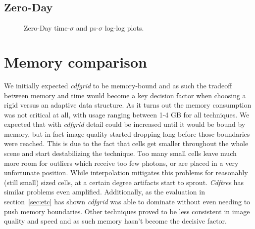 \subsection{Zero-Day}

\begin{figure}
    \centering
    \begin{subfigure}{.5\textwidth}
      \centering
        \caption{}
        \label{fig:zd_t}
    \end{subfigure}%
    \begin{subfigure}{.5\textwidth}
        \caption{}
        \label{fig:zd_ps}
    \end{subfigure}
    \caption{Zero-Day time-$\sigma$ and ps-$\sigma$ log-log plots.}
    \label{fig:zd}
\end{figure}

\section{Memory comparison}

We initially expected \textit{cdfgrid} to be memory-bound and as such the tradeoff between memory and time would become a key decision factor when choosing a rigid versus an adaptive data structure. As it turns out the memory consumption was not critical at all, with usage ranging between 1-4 GB for all techniques. We expected that with \textit{cdfgrid} detail could be increased until it would be bound by memory, but in fact image quality started dropping long before those boundaries were reached. This is due to the fact that cells get smaller throughout the whole scene and start destabilizing the technique. Too many small cells leave much more room for outliers which receive too few photons, or are placed in a very unfortunate position. While interpolation mitigates this problems for reasonably (still small) sized cells, at a certain degree artifacts start to sprout. \textit{Cdftree} has similar problems even amplified.  Additionally, as the evaluation in section~\ref{sec:etc} has shown \textit{cdfgrid} was able to dominate without even needing to push memory boundaries. Other techniques proved to be less consistent in image quality and speed and as such memory hasn't become the decisive factor. 

